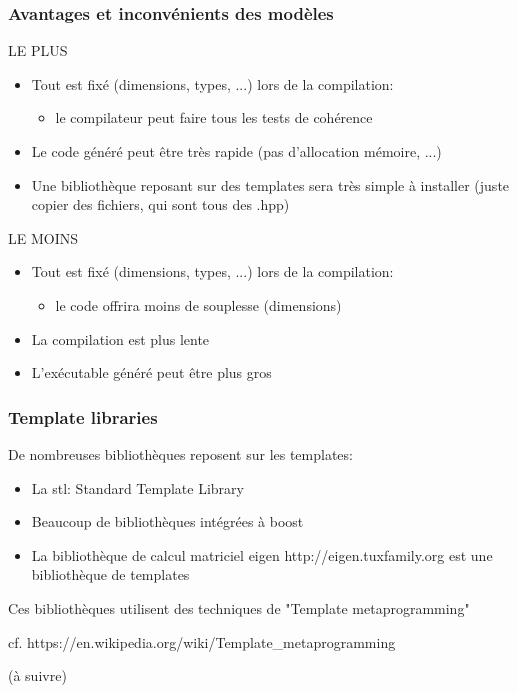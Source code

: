 \documentclass{beamer}
\begin{document}
\begin{frame}
\frametitle {Avantages et inconvénients des modèles}

\begin{block}{LE PLUS}
\begin{itemize}
\item{Tout est fixé (dimensions, types, ...) lors de la compilation:\begin{itemize}\item{le compilateur peut faire tous les tests de cohérence}\end{itemize} }
\item{Le code généré peut être très rapide (pas d'allocation mémoire, ...)}
\item{Une bibliothèque reposant sur des templates sera très simple à installer (juste copier des fichiers, qui sont tous des .hpp)}
\end{itemize}
\end{block}

\begin{block}{LE MOINS}
\begin{itemize}
\item{Tout est fixé (dimensions, types, ...) lors de la compilation:\begin{itemize}\item{le code offrira moins de souplesse (dimensions)}\end{itemize} }
\item{La compilation est plus lente}
\item{L'exécutable généré peut être plus gros}
\end{itemize}
\end{block}

\end{frame}

\begin{frame}
\frametitle {Template libraries}
De nombreuses bibliothèques reposent sur les templates:
\begin{itemize}
\item{La stl: Standard Template Library}
\item{Beaucoup de bibliothèques intégrées à boost}
\item{La bibliothèque de calcul matriciel eigen http://eigen.tuxfamily.org est une bibliothèque de templates}
\end{itemize}
Ces bibliothèques utilisent des techniques de "Template metaprogramming"

cf. https://en.wikipedia.org/wiki/Template\_metaprogramming

\end{frame}

\begin{frame}
(à suivre)
\end{frame}
\end{document}
